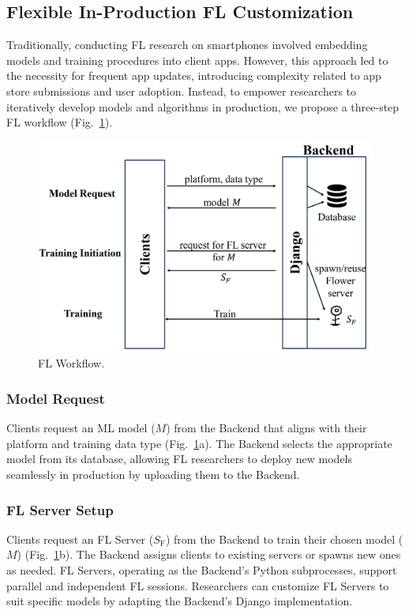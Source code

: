 \documentclass[letterpaper]{article} %
\begin{document}
\subsection{Flexible In-Production FL Customization}
\newcommand{\model}{$M$}
\newcommand{\fs}{$S_\mathrm F$}
Traditionally, conducting FL research on smartphones involved
embedding models and training procedures into client apps.
However, this approach led to the necessity for frequent app updates,
introducing complexity related to app store submissions and user adoption.
Instead,
to empower researchers to iteratively develop models and algorithms
in production, we propose a three-step FL workflow
(Fig.~\ref{fig:fl-workflow}).
\begin{figure}
    \centering
    \includegraphics*[width=\linewidth]{fl_workflow.pdf}
    \caption{FL Workflow.}
    \label{fig:fl-workflow}
\end{figure}

\subsubsection{Model Request}
Clients request an ML model (\model{}) from the Backend that
aligns with their platform and training data type
(Fig.~\ref{fig:fl-workflow}a).
The Backend selects the appropriate model from its database,
allowing FL researchers to deploy new models seamlessly
in production by uploading them to the Backend.

\subsubsection{FL Server Setup}
Clients request an FL Server (\fs{}) from the Backend to
train their chosen model (\model{})
(Fig.~\ref{fig:fl-workflow}b).
The Backend assigns clients to existing servers or spawns new ones as needed.
FL Servers, operating as the Backend's Python subprocesses,
support parallel and independent FL sessions.
Researchers can customize FL Servers to suit specific models by
adapting the Backend's Django implementation.
\end{document}
